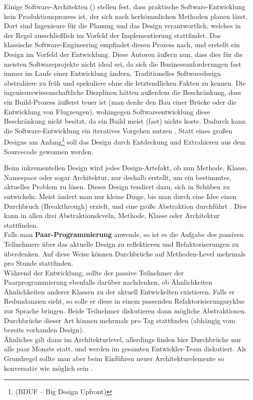 Einige Software-Architekten (\cite{neal_ford_emergent_2010,jack_reeves_three_1992,glenn_vanderburg_real_2010}) stellen fest, dass praktische Software\hyp{}Entwicklung kein Produktionsprozess ist, der sich nach herkömmlichen Methoden planen lässt. Dort sind Ingenieure für die Planung und das Design verantwortlich, welches in der Regel ausschließlich im Vorfeld der Implementierung stattfindet. Das klassische Software-Engineering empfindet diesen Prozess nach, und erstellt ein Design im Vorfeld der Entwicklung. Diese Autoren äußern nun, dass dies für die meisten Softwareprojekte nicht ideal sei, da sich die Businessanforderungen fast immer im Laufe einer Entwicklung ändern. Traditionelles Softwaredesign abstrahiere zu früh und spekuliere ohne die letztendlichen Fakten zu kennen. Die ingenieurswissenschaftliche Diszplinen hätten außerdem die Beschränkung, dass ein Build-Prozess äußerst teuer ist (man denke den Bau einer Brücke oder die Entwicklung von Flugzeugen), wohingegen Softwareentwicklung diese Beschränkung nicht besitzt, da ein Build meist (fast) nichts koste. Dadurch kann die Software-Entwicklung ein iteratives Vorgehen nutzen \cite{neal_ford_emergent_2010,glenn_vanderburg_real_2010,jack_reeves_three_1992}. Statt eines großen Designs am Anfang\footnote{(BDUF -- Big Design Upfront)} soll das Design durch Entdeckung und Extrahieren aus dem Sourcecode gewonnen werden.


Beim inkrementellen Design wird jedes Design-Artefakt, ob nun Methode, Klasse, Namespace oder sogar Architektur, nur deshalb erstellt, um ein bestimmtes, aktuelles Problem zu lösen. Dieses Design tendiert dazu, sich in Schüben zu entwickeln: Meist ändert man nur kleine Dinge, bis man durch eine Idee einen Durchbruch (Breakthrough) erzielt, und eine größe Abstraktion durchführt \cite{shore_art_2007,evans_domain_driven_2003}. Dies kann in allen drei Abstraktionsleveln, Methode, Klasse oder Architektur stattfinden.\\
Falls man \textbf{Paar-Programmierung} anwende, so ist es die Aufgabe des passiven Teilnehmers über das aktuelle Design zu reflektieren und Refaktoriserungen zu überdenken. Auf diese Weise können Durchbrüche auf Methoden-Level mehrmals pro Stunde stattfinden.\\
Während der Entwicklung, sollte der passive Teilnehmer der Paarprogrammierung ebenfalls darüber nachdenken, ob Ähnlichkeiten Ähnlichkeiten anderer Klassen zu der aktuell Entwickelten existieren. Falls er Redundanzien sieht, so solle er diese in einem passenden Refaktorisierungszyklus zur Sprache bringen. Beide Teilnehmer diskutieren dann mögliche Abstraktionen. Durchbrüche dieser Art können mehrmals pro Tag stattfinden (abhängig vom bereits vorhanden Design).\\
Ähnliches gilt dann im Architekturlevel, allerdings finden hier Durchbrüche nur alle paar Monate statt, und werden im gesamten Entwickler-Team diskutiert. Als Grundregel sollte man aber beim Einführen neuer Architekturelemente so konversativ wie möglich sein \citep{shore_art_2007}.

